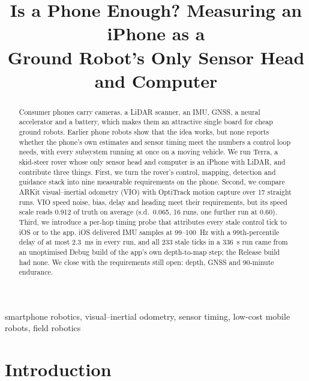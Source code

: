 \documentclass[conference]{IEEEtran}
\newcommand{\todo}[1]{\textcolor{red}{[TODO: #1]}}
\begin{document}
\title{Is a Phone Enough? Measuring an iPhone as a\\Ground Robot's Only Sensor Head and Computer}

\author{
\IEEEauthorblockA{\todo{affiliation, city, country}\\
\todo{email}}
}

\maketitle

\begin{abstract}
Consumer phones carry cameras, a LiDAR scanner, an IMU, GNSS, a neural accelerator and a battery, which makes them an attractive single board for cheap ground robots.
Earlier phone robots show that the idea works, but none reports whether the phone's own estimates and sensor timing meet the numbers a control loop needs, with every subsystem running at once on a moving vehicle.
We run Terra, a skid-steer rover whose only sensor head and computer is an iPhone with LiDAR, and contribute three things.
First, we turn the rover's control, mapping, detection and guidance stack into nine measurable requirements on the phone.
Second, we compare ARKit visual--inertial odometry (VIO) with OptiTrack motion capture over 17 straight runs.
VIO speed noise, bias, delay and heading meet their requirements, but its speed scale reads 0.912 of truth on average (s.d.\ 0.065, 16 runs, one further run at 0.60).
Third, we introduce a per-hop timing probe that attributes every stale control tick to iOS or to the app.
iOS delivered IMU samples at 99--100~Hz with a 99th-percentile delay of at most 2.3~ms in every run, and all 233 stale ticks in a 336~s run came from an unoptimised Debug build of the app's own depth-to-map step; the Release build had none.
We close with the requirements still open: depth, GNSS and 90-minute endurance.
\end{abstract}

\begin{IEEEkeywords}
smartphone robotics, visual--inertial odometry, sensor timing, low-cost mobile robots, field robotics
\end{IEEEkeywords}

\section{Introduction}
\label{sec:intro}
\end{document}
